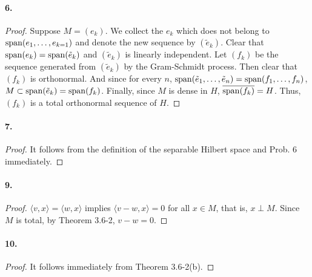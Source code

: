   \paragraph{6.}
  \begin{proof}
    Suppose $M=(e_k)$. We collect the $e_k$ which does not belong to $\operatorname{span}(e_1,
    \dots,e_{k=1})$ and denote the new sequence by $(\tilde{e}_k)$. Clear that
    $\operatorname{span}(e_k)=\operatorname{span}(\tilde{e}_k)$ and $(\tilde{e}_k)$ is linearly independent.
    Let $(f_k)$ be the sequence generated from $(\tilde{e}_k)$ by the
    Gram-Schmidt process. Then clear that $(f_k)$ is orthonormal. And since for
    every $n$, $\operatorname{span}(\tilde{e}_1,\dots,\tilde{e}_n)=\operatorname{span}(f_1,\dots,f_n)$,
    $M\subset\operatorname{span}(\tilde{e}_k)=\operatorname{span}(f_k)$. Finally, since $M$ is dense in $H$,
    $\overline{\operatorname{span}(f_k)}=H$. Thus, $(f_k)$ is a total orthonormal sequence of
    $H$.
  \end{proof}
  
  \paragraph{7.}
  \begin{proof}
    It follows from the definition of the separable Hilbert space and Prob. 6
    immediately.
  \end{proof}
  
  \paragraph{9.}
  \begin{proof}
    $\langle v,x\rangle=\langle w,x\rangle$ implies $\langle v-w,x\rangle=0$ for
    all $x\in M$, that is, $x\perp M$. Since $M$ is total, by Theorem 3.6-2, $v
    -w=0$.
  \end{proof}
  
  \paragraph{10.}
  \begin{proof}
    It follows immediately from Theorem 3.6-2(b).
  \end{proof}

















